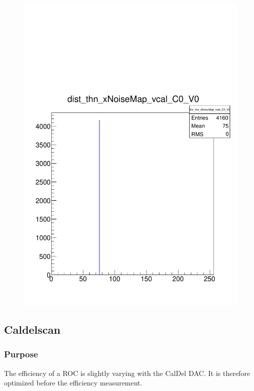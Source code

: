 \documentclass[a4paper,12pt,twoside]{article}
\begin{document}
\begin{figure} [h!]
\begin{minipage}{.48\textwidth}
  \includegraphics[width=\textwidth]{./HRSCurves_thnDist.pdf}
  \label{HRSCurves-thnDist}
\end{minipage}
\end{figure}



\subsection{Caldelscan}

\subsubsection{Purpose}
The efficiency of a ROC is slightly varying with the CalDel DAC. It is therefore optimized before the efficiency measurement.
\end{document}
